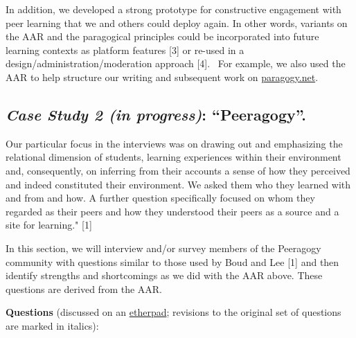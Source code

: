 In addition, we developed a strong prototype for constructive engagement
with peer learning that we and others could deploy again. In other
words, variants on the AAR and the paragogical principles could be
incorporated into future learning contexts as platform features {[}3{]}
or re-used in a design/administration/moderation approach {[}4{]}.~ For
example, we also used the AAR to help structure our writing and
subsequent work on \href{http://paragogy.net}{paragogy.net}.

\subsection{\emph{Case Study 2 (in progress)}: ``Peeragogy''.}

Our particular focus in the interviews was on drawing out and
emphasizing the relational dimension of students, learning experiences
within their environment and, consequently, on inferring from their
accounts a sense of how they perceived and indeed constituted their
environment. We asked them who they learned with and from and how. A
further question specifically focused on whom they regarded as their
peers and how they understood their peers as a source and a site for
learning." {[}1{]}

In this section, we will interview and/or survey members of the
Peeragogy community with questions similar to those used by Boud and Lee
{[}1{]} and then identify strengths and shortcomings as we did with the
AAR above. These questions are derived from the AAR.

\textbf{Questions} (discussed on an
\href{https://peeragogy.etherpad.mozilla.org/7}{etherpad}; revisions to
the original set of questions are marked in italics):

